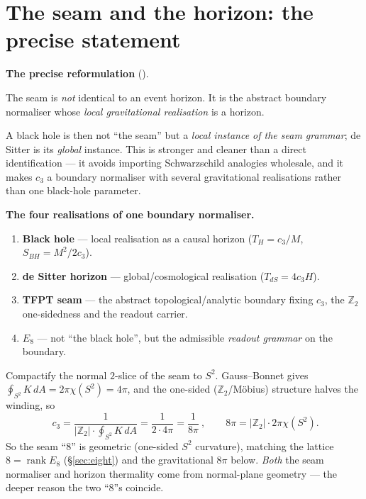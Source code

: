 \documentclass[11pt,a4paper]{article}
\newcommand{\cthree}{c_3}
\newcommand{\Z}{\mathbb Z}
\begin{document}
\section{The seam and the horizon: the precise statement}\label{sec:crosslinks}
\par\smallskip\noindent\textbf{The precise reformulation} (\mC).
\begin{keyeq}
The seam is \emph{not} identical to an event horizon. It is the abstract boundary normaliser whose
\emph{local gravitational realisation} is a horizon.
\end{keyeq}
\noindent A black hole is then not ``the seam'' but a \emph{local instance of the seam grammar}; de Sitter is its
\emph{global} instance. This is stronger and cleaner than a direct identification --- it avoids importing
Schwarzschild analogies wholesale, and it makes $\cthree$ a boundary normaliser with several gravitational
realisations rather than one black-hole parameter.

\noindent\textbf{The four realisations of one boundary normaliser.}
\begin{enumerate}[leftmargin=1.7em,itemsep=1pt]
\item \textbf{Black hole} --- local realisation as a causal horizon ($T_H=\cthree/M$, $S_{BH}=M^2/2\cthree$).
\item \textbf{de Sitter horizon} --- global/cosmological realisation ($T_{dS}=4\cthree H$).
\item \textbf{TFPT seam} --- the abstract topological/analytic boundary fixing $\cthree$, the $\Z_2$
one-sidedness and the readout carrier.
\item \textbf{$E_8$} --- not ``the black hole'', but the admissible \emph{readout grammar} on the boundary.
\end{enumerate}

\begin{winbox}
Compactify the normal $2$-slice of the seam to $S^2$. Gauss--Bonnet gives
$\oint_{S^2}K\,dA=2\pi\chi(S^2)=4\pi$, and the one-sided ($\Z_2$/M\"obius) structure halves the winding, so
\[
  \boxed{\ \cthree=\frac{1}{|\Z_2|\cdot\oint_{S^2}K\,dA}=\frac{1}{2\cdot4\pi}=\frac1{8\pi}\ },\qquad
  8\pi=|\Z_2|\cdot2\pi\chi(S^2).
\]
So the seam ``$8$'' is geometric (one-sided $S^2$ curvature), matching the lattice $8=\operatorname{rank}E_8$
(\S\ref{sec:eight}) and the gravitational $8\pi$ below. \emph{Both} the seam normaliser and horizon
thermality come from normal-plane geometry --- the deeper reason the two ``$8$''s coincide.
\end{winbox}
\end{document}
